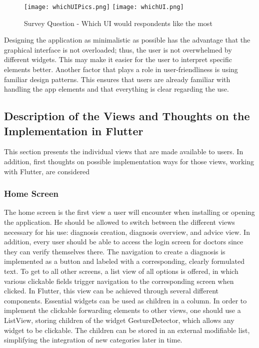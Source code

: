 \begin{figure}[H]
	\centering
	\texttt{[image: whichUIPics.png]}
	\texttt{[image: whichUI.png]}
	\caption[Survey Question]{Survey Question - Which UI would respondents like the most}
\end{figure}
\noindent
Designing the application as minimalistic as possible has the advantage that the graphical interface is not overloaded; thus, the user is not overwhelmed by different widgets. This may make it easier for the user to interpret specific elements better. Another factor that plays a role in user-friendliness is using familiar design patterns. This ensures that users are already familiar with handling the app elements and that everything is clear regarding the use. 

\subsection{Description of the Views and Thoughts on the Implementation in Flutter}
This section presents the individual views that are made available to users. In addition, first thoughts on possible implementation ways for those views, working with Flutter, are considered
\subsubsection{\textbf{Home Screen}}
The home screen is the first view a user will encounter when installing or opening the application. He should be allowed to switch between the different views necessary for his use: diagnosis creation, diagnosis overview, and advice view. In addition, every user should be able to access the login screen for doctors since they can verify themselves there. The navigation to create a diagnosis is implemented as a button and labeled with a corresponding, clearly formulated text. To get to all other screens, a list view of all options is offered, in which various clickable fields trigger navigation to the corresponding screen when clicked. In Flutter, this view can be achieved through several different components. Essential widgets can be used as children in a column. In order to implement the clickable forwarding elements to other views, one should use a ListView, storing children of the widget GestureDetector, which allows any widget to be clickable. The children can be stored in an external modifiable list, simplifying the integration of new categories later in time.

